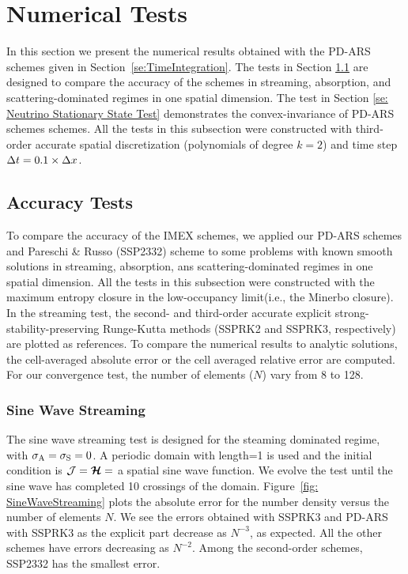 \section{Numerical Tests}\label{se:NumericalTests}

In this section we present the numerical results obtained with the PD-ARS schemes given in Section~\ref{se:TimeIntegration}.
The tests in Section \ref{se: Accuracy Tests} are designed to compare the accuracy of the schemes in streaming, absorption, and scattering-dominated regimes in one spatial dimension.
The test in Section \ref{se: Neutrino Stationary State Test} demonstrates the convex-invariance of PD-ARS schemes schemes.
All the tests in this subsection were constructed with third-order accurate spatial discretization (polynomials of degree $k=2$) and time step $\Delta t = 0.1 \times \Delta x $.

\subsection{Accuracy Tests}
\label{se: Accuracy Tests}
To compare the accuracy of the IMEX schemes, we applied our PD-ARS schemes and Pareschi \& Russo \cite{pareschiRusso_2005} (SSP2332) scheme to some problems with known smooth solutions in streaming, absorption, ans scattering-dominated regimes in one spatial dimension.
All the tests in this subsection were constructed with the maximum entropy closure in the low-occupancy limit(i.e., the Minerbo closure).
In the streaming test, the second- and third-order accurate explicit strong-stability-preserving Runge-Kutta methods\cite{gottlieb_etal_2001} (SSPRK2 and SSPRK3, respectively) are plotted as references.
To compare the numerical results to analytic solutions, the cell-averaged absolute error or the cell averaged relative error are computed.
For our convergence test, the number of elements ($N$) vary from 8 to 128.

\subsubsection{Sine Wave Streaming}
The sine wave streaming test is designed for the steaming dominated regime, with $\sigma_{{\rm A}} = \sigma_{{\rm S}} = 0$.
A periodic domain with length=1 is used and the initial condition is $\mathcal{J} = \boldsymbol{\mathcal{H}} =$ a spatial sine wave function.
We evolve the test until the sine wave has completed 10 crossings of the domain.
Figure~\ref{fig: SineWaveStreaming} plots the absolute error for the number density versus the number of elements $N$.
We see the errors obtained with SSPRK3 and PD-ARS with SSPRK3 as the explicit part decrease as $N^{-3}$, as expected.
All the other schemes have errors decreasing as $N^{-2}$.
Among the second-order schemes, SSP2332 has the smallest error.


